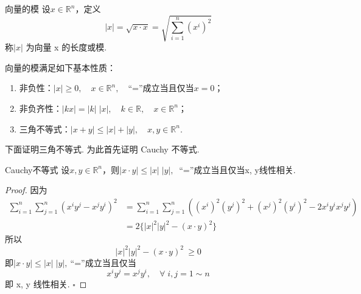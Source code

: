 \documentclass{article}
\begin{document}
\vspace{20pt}

\begin{definition}{向量的模}{}
    设\(x \in \mathbb{R}^n\)，定义
    \begin{equation*}
        | x |= \sqrt{x \cdot x} = \sqrt{\sum_{i=1}^n (x^i)^2 }
    \end{equation*}
    称\(| x |\) 为向量 x 的长度或模.
\end{definition}

向量的模满足如下基本性质：
\begin{enumerate}
    \item 非负性：\(| x | \ge 0,\quad x \in \mathbb{R}^n, \quad \)“=”成立当且仅当\(x = 0\)；
    \item 非负齐性：\(| kx |= | k |\; | x |,\quad k \in \mathbb{R},\quad x \in \mathbb{R}^n\)；
    \item 三角不等式：\(| x + y | \le | x |+ | y |,\quad x, y \in \mathbb{R}^n\).
\end{enumerate}

\newpage

下面证明三角不等式. 为此首先证明 Cauchy 不等式.

\vspace{10pt}

\begin{proposition}{Cauchy不等式}{}
    设\(x, y \in \mathbb{R}^n\)，则\(| x \cdot y | \le | x |\; | y |,\  \) “=”成立当且仅当x, y线性相关.
\end{proposition}

\vspace{20pt}

\begin{proof}
    因为
    \begin{align*}
        \sum_{i=1}^n \sum_{j = 1}^n(x^i y^j - x^j y^i )^2 &=  \sum_{i = 1}^n \sum_{j = 1}^n ((x^i)^2(y^j)^2 + (x^j)^2(y^i)^2 - 2x^i y^i x^j y^j) \\
        &= 2 \{| x |^2 | y |^2 - (x \cdot y)^2\}
    \end{align*}
    所以
    \begin{equation*}
        | x |^2 | y |^2 - (x \cdot y)^2\ \ge 0
    \end{equation*}
    即\(| x \cdot y | \le | x |\; | y |, \ \)“=”成立当且仅当
    \begin{equation*}
        x^i y^j = x^j y^i,\quad \forall \; i, j = 1 \sim n
    \end{equation*}
    即 x, y 线性相关.  \(\square\)
\end{proof}
\end{document}
